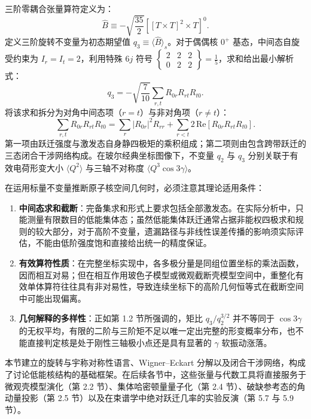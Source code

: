 三阶零耦合张量算符定义为：
\begin{equation}\label{eq:2-1-27}
\hat{B} \equiv -\sqrt{\frac{35}{2}} [[T \times T]^2 \times T]^0.
\end{equation}
定义三阶旋转不变量为初态期望值 $q_3 \equiv \langle \hat{B} \rangle_s$。对于偶偶核 $0^+$ 基态，中间态自旋受约束为 $I_r = I_t = 2$，利用特殊 $6j$ 符号 $\begin{Bmatrix} 2 & 2 & 2 \\ 0 & 2 & 2 \end{Bmatrix} = \frac{1}{5}$，求和给出最小解析式：
\begin{equation}\label{eq:2-1-28}
q_3 = -\sqrt{\frac{7}{10}} \sum_{r, t} R_{0r} R_{rt} R_{t0}.
\end{equation}
将该求和拆分为对角中间态项（$r = t$）与非对角项（$r \neq t$）：
\begin{equation}\label{eq:2-1-29}
\sum_{r, t} R_{0r} R_{rt} R_{t0} = \sum_r |R_{0r}|^2 R_{rr} + \sum_{r < t} 2 \, \mathrm{Re}[ R_{0r} R_{rt} R_{t0} ].
\end{equation}
第一项由跃迁强度与激发态自身静四极矩的乘积组成；第二项则由包含跨带跃迁的三态闭合干涉网络构成。在玻尔经典坐标图像下，不变量 $q_2$ 与 $q_3$ 分别关联于有效电荷形变大小 $\langle Q^2 \rangle$ 与三轴不对称度 $\langle Q^3 \cos 3\gamma \rangle$。

在运用标量不变量推断原子核空间几何时，必须注意其理论适用条件：
\begin{enumerate}
\item \textbf{中间态求和截断}：完备集求和形式上要求包括全部激发态。在实际分析中，只能测量有限数目的低能集体态；虽然低能集体跃迁通常占据非能权四极求和规则的较大部分，对于高阶不变量，遗漏路径与非线性误差传播的影响须实际评估，不能由低阶强度饱和直接给出统一的精度保证。
\item \textbf{有效算符性质}：在完整坐标实现中，各多极分量是同组位置坐标的乘法函数，因而相互对易；但在相互作用玻色子模型或微观截断壳模型空间中，重整化有效单体算符往往具有非对易性，导致连续坐标下的高阶几何恒等式在截断空间中可能出现偏离。
\item \textbf{几何解释的多样性}：正如第 1.2 节所强调的，矩比 $q_3 / q_2^{3/2}$ 并不等同于 $\cos 3\gamma$ 的无权平均，有限的二阶与三阶矩不足以唯一定出完整的形变概率分布，也不能直接判定核是处于刚性三轴极小点还是具有显著的 $\gamma$ 软振动涨落。
\end{enumerate}

本节建立的旋转与宇称对称性语言、Wigner–Eckart 分解以及闭合干涉网络，构成了讨论低能核结构的基础框架。在后续各节中，这些张量与代数工具将直接服务于微观壳模型演化（第 2.2 节）、集体哈密顿量量子化（第 2.4 节）、破缺参考态的角动量投影（第 2.5 节）以及在束谱学中绝对跃迁几率的实验反演（第 5.7 与 5.9 节）。
